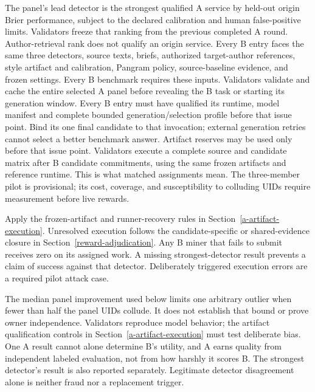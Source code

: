 The panel's lead detector is the strongest qualified A service by held-out
origin Brier performance, subject to the declared calibration and human
false-positive limits. Validators freeze that ranking from the previous
completed A round.
Author-retrieval rank does not qualify an origin service. Every B entry
faces the same three detectors, source texts, briefs, authorized target-author
references, style artifact and calibration, Pangram policy,
source-baseline evidence, and frozen settings. Every B benchmark requires
these inputs. Validators validate and cache the
entire selected A panel before revealing the B task or starting its
generation window. Every B entry must have qualified its runtime,
model manifest and complete bounded generation/selection profile before
that issue point. Bind its one final candidate to that invocation;
external generation retries cannot select a better benchmark answer.
Artifact reserves may be used only before that issue
point. Validators execute a complete source and candidate matrix after B
candidate commitments, using the same frozen artifacts and reference runtime. This is
what matched assignments mean. The three-member pilot is provisional;
its cost, coverage, and susceptibility to colluding UIDs require
measurement before live rewards.

Apply the frozen-artifact and runner-recovery rules in
Section~\ref{a-artifact-execution}. Unresolved execution follows the
candidate-specific or shared-evidence closure in Section~\ref{reward-adjudication}.
Any B miner that fails to submit receives zero on its
assigned work. A missing strongest-detector result prevents a claim of
success against that detector. Deliberately triggered execution errors
are a required pilot attack case.

The median panel improvement used below limits one arbitrary outlier
when fewer than half the panel UIDs collude. It does not establish that
bound or prove owner independence. Validators reproduce model behavior;
the artifact qualification controls in Section~\ref{a-artifact-execution}
must test deliberate bias.
One A result cannot alone determine B's utility, and A earns quality
from independent labeled evaluation, not from how harshly it scores B.
The strongest detector's result is also reported separately. Legitimate
detector disagreement alone is neither fraud nor a replacement trigger.

